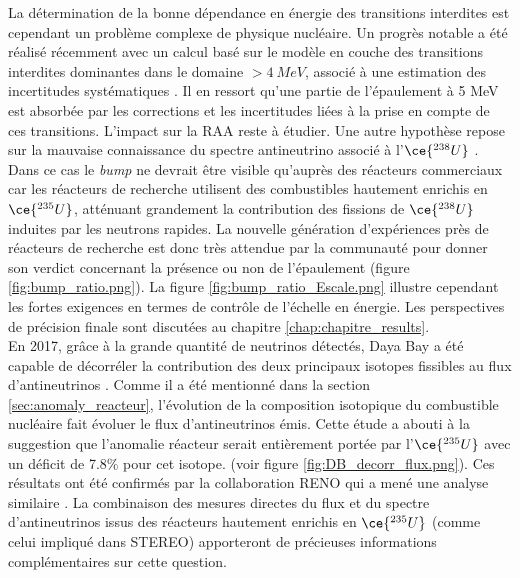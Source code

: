 La détermination de la bonne dépendance en énergie des transitions interdites est cependant un problème complexe de physique nucléaire. Un progrès notable a été réalisé récemment avec un calcul basé sur le modèle en couche des transitions interdites dominantes dans le domaine $>\SI{4}{MeV}$, associé à une estimation des incertitudes systématiques \cite{Hayen:2018uyg}. Il en ressort qu'une partie de l'épaulement à 5 MeV est absorbée par les corrections et les incertitudes liées à la prise en compte de ces transitions. L’impact sur la RAA reste à étudier. Une autre hypothèse repose sur la mauvaise connaissance du spectre antineutrino associé à l’$\ce{^{238}U}$ \cite{Hayes:2015yka}. Dans ce cas le \textit{bump} ne devrait être visible qu’auprès des réacteurs commerciaux car les réacteurs de recherche utilisent des combustibles hautement enrichis en $\ce{^{235}U}$, atténuant grandement la contribution des fissions de $\ce{^{238}U}$ induites par les neutrons rapides. La nouvelle génération d’expériences près de réacteurs de recherche est donc très attendue par la communauté pour donner son verdict concernant la présence ou non de l'épaulement (figure \ref{fig:bump_ratio.png}). La figure \ref{fig:bump_ratio_Escale.png} illustre cependant les fortes exigences en termes de contrôle de l’échelle en énergie. Les perspectives de précision finale sont discutées au chapitre \ref{chap:chapitre_results}.\\

En 2017, grâce à la grande quantité de neutrinos détectés, Daya Bay a été capable de décorréler la contribution des deux principaux isotopes fissibles au flux d’antineutrinos \cite{An:2017osx}. Comme il a été mentionné dans la section \ref{sec:anomaly_reacteur}, l’évolution de la composition isotopique du combustible nucléaire fait évoluer le flux d’antineutrinos émis. Cette étude a abouti à la suggestion que l’anomalie réacteur serait entièrement portée par l’$\ce{^{235}U}$ avec un déficit de 7.8\% pour cet isotope. (voir figure \ref{fig:DB_decorr_flux.png}). Ces résultats ont été confirmés par la collaboration RENO qui a mené une analyse similaire \cite{RENO:2018pwo}. La combinaison des mesures directes du flux et du spectre d’antineutrinos issus des réacteurs hautement enrichis en $\ce{^{235}U}$ (comme celui impliqué dans STEREO) apporteront de précieuses informations complémentaires sur cette question.\\

